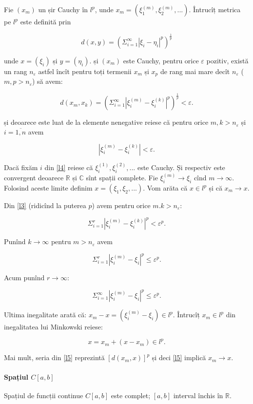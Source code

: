 \documentclass[a4paper,12pt]{article}
\theoremstyle{change}
\newenvironment{proof}{{\bf Demonstrație:} }{}
\begin{document}
\begin{proof}
Fie $(x_m)$ un șir Cauchy în $l^p$, unde $x_m=(\xi_1^{(m)},\xi_2^{(m)},...)$. Întrucîț metrica pe $l^p$ este definită prin

\[
  d(x,y) = (\Sigma_{i=1}^\infty |\xi_i - \eta_i|^p)^{\frac{1}{p}}
\]

unde $x=(\xi_i)$ și $y=(\eta_i)$.  și $(x_m)$ este Cauchy, pentru orice $\varepsilon$ pozitiv, există un rang $n_{\varepsilon}$ astfel încît pentru toți termenii $x_m$ și $x_p$ de rang mai mare decît $n_{\varepsilon}$ ($m,p>n_{\varepsilon}$) să avem:

\[
\label{l3}
d(x_m,x_k) = (\Sigma_{i=1}^\infty |\xi_i^{(m)} - \xi_i^{(k)}|^p)^{\frac{1}{p}} < \varepsilon.
\]

și deoarece este luat de la elemente nenegative reiese că pentru orice $m,k>n_\varepsilon$ și $i=\overline{1,n}$ avem

\[
\label{l4}
|\xi_i^{(m)} - \xi_i^{(k)}| < \varepsilon.
\]

Dacă fixăm $i$ din \ref{l4} reiese că $\xi_i^{(1)},\xi_i^{(2)},...$ este Cauchy. Și respectiv este convergent deoarece $\mathbb{R}$ și $\mathbb{C}$ sînt spații complete. Fie $\xi_i^{(m)}\to \xi_i$ cînd $m\to\infty$. Folosind aceste limite definim $x=(\xi_1, \xi_2,...)$. Vom arăta că $x\in l^p$ și că $x_m\to x$.

Din \ref{l3} (ridicînd la puterea $p$) avem pentru orice $m.k>n_\varepsilon$:

\[
\Sigma_{i=1}^r |\xi_i^{(m)} - \xi_i^{(k)}|^p < \varepsilon^p.
\]

Punînd $k\to\infty$ pentru $m>n_\varepsilon$ avem

\[
\Sigma_{i=1}^r |\xi_i^{(m)} - \xi_i|^p \leq \varepsilon^p.
\]

Acum punînd $r\to\infty$:

\[
\label{l5}
\Sigma_{i=1}^\infty |\xi_i^{(m)} - \xi_i|^p \leq \varepsilon^p.
\]

Ultima inegalitate arată că: $x_m-x=(\xi_i^{(m)}-\xi_i)\in l^p$. Întrucîț $x_m\in l^p$ din inegalitatea lui Minkowski reiese:

\[
x=x_m+(x-x_m)\in l^p.
\]

Mai mult, seria din \ref{l5} reprezintă $[d(x_m,x)]^p$ și deci \ref{l5} implică $x_m\to x$.

\end{proof}

\paragraph{Spațiul $C[a,b]$} Spațiul de funcții continue $C[a,b]$ este complet; $[a,b]$ interval închis în $\mathbb{R}$.
\end{document}
